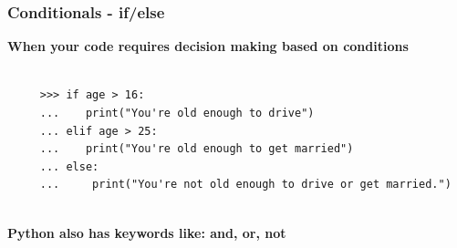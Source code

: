 \documentclass[12pt, aspectratio=169]{beamer}
\begin{document}
\begin{frame} [fragile]
  \frametitle{Conditionals - if/else}
\textbf{When your code requires decision making based on conditions}
\vspace{1em}
 \begin{verbatim}

     >>> if age > 16:
     ...    print("You're old enough to drive")
     ... elif age > 25:
     ...    print("You're old enough to get married")
     ... else:
     ...     print("You're not old enough to drive or get married.")
 
\end{verbatim}
\vspace{1em}
\textbf{Python also has keywords like: and, or, not}
\vspace{1em}
\end{frame}








\end{document}
